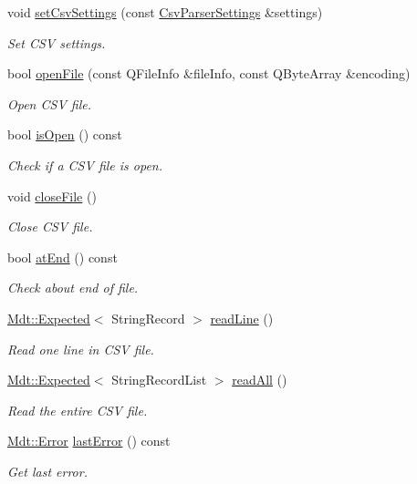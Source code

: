 \begin{DoxyCompactItemize}
\item 
void \hyperlink{class_mdt_1_1_plain_text_1_1_csv_file_parser_ae5a305689ca8b7aaee94f51b95464135}{set\+Csv\+Settings} (const \hyperlink{class_mdt_1_1_plain_text_1_1_csv_parser_settings}{Csv\+Parser\+Settings} \&settings)
\begin{DoxyCompactList}\small\item\em Set C\+SV settings. \end{DoxyCompactList}\item 
bool \hyperlink{class_mdt_1_1_plain_text_1_1_csv_file_parser_a9b81b6061eb86888af9fe51752f8617a}{open\+File} (const Q\+File\+Info \&file\+Info, const Q\+Byte\+Array \&encoding)
\begin{DoxyCompactList}\small\item\em Open C\+SV file. \end{DoxyCompactList}\item 
bool \hyperlink{class_mdt_1_1_plain_text_1_1_csv_file_parser_a2e8e57b7cd46bccf4c6953b9654c73fa}{is\+Open} () const 
\begin{DoxyCompactList}\small\item\em Check if a C\+SV file is open. \end{DoxyCompactList}\item 
void \hyperlink{class_mdt_1_1_plain_text_1_1_csv_file_parser_aee81b90521927b6f8eb1482633c0a67d}{close\+File} ()
\begin{DoxyCompactList}\small\item\em Close C\+SV file. \end{DoxyCompactList}\item 
bool \hyperlink{class_mdt_1_1_plain_text_1_1_csv_file_parser_af71b58865205fac3eebd00b416f58a2f}{at\+End} () const 
\begin{DoxyCompactList}\small\item\em Check about end of file. \end{DoxyCompactList}\item 
\hyperlink{class_mdt_1_1_expected}{Mdt\+::\+Expected}$<$ String\+Record $>$ \hyperlink{class_mdt_1_1_plain_text_1_1_csv_file_parser_ab0b04108ed3e2ea4fa272567d7bed2ed}{read\+Line} ()
\begin{DoxyCompactList}\small\item\em Read one line in C\+SV file. \end{DoxyCompactList}\item 
\hyperlink{class_mdt_1_1_expected}{Mdt\+::\+Expected}$<$ String\+Record\+List $>$ \hyperlink{class_mdt_1_1_plain_text_1_1_csv_file_parser_a205ee7b5fb424e48652ffeb722f2f9cb}{read\+All} ()
\begin{DoxyCompactList}\small\item\em Read the entire C\+SV file. \end{DoxyCompactList}\item 
\hyperlink{class_mdt_1_1_error}{Mdt\+::\+Error} \hyperlink{class_mdt_1_1_plain_text_1_1_csv_file_parser_a7c9d6b5675ee9d5b84d99197264ebffb}{last\+Error} () const 
\begin{DoxyCompactList}\small\item\em Get last error. \end{DoxyCompactList}\end{DoxyCompactItemize}


